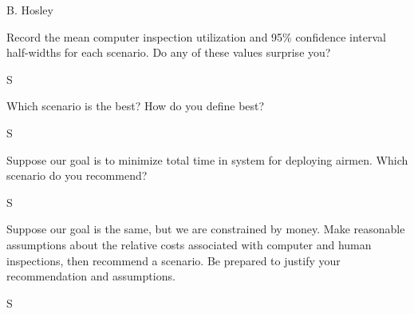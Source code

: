 \documentclass[answers]{exam}
\begin{document}
\hspace{\fill} {\large B. Hosley}
\bigskip

\begin{questions}

\question 
Record the mean computer inspection utilization and 95\% confidence interval half-widths for each scenario. Do any of these values surprise you?
\begin{solution}
	S
\end{solution}

\question 
Which scenario is the best? How do you define best?
\begin{solution}
	S
\end{solution}

\question 
Suppose our goal is to minimize total time in system for deploying airmen. Which scenario do you recommend?
\begin{solution}
	S
\end{solution}

\question 
Suppose our goal is the same, but we are constrained by money. Make reasonable assumptions about the relative costs associated with computer and human inspections, then recommend a scenario. Be prepared to justify your recommendation and assumptions.
\begin{solution}
	S
\end{solution}

\end{questions}
\end{document}
